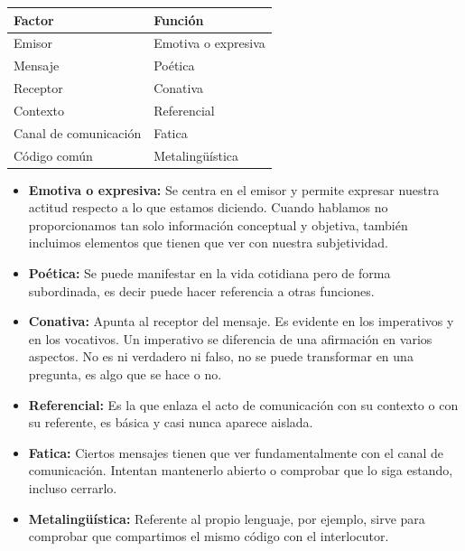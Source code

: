 \documentclass[a4paper,12pt,titlepage]{article} %
\begin{document}
\begin{center}
 \begin{tabular}{|l|l|}
   \hline
  \textbf{Factor}& \textbf{Función} \\
  \hline
  Emisor& Emotiva o expresiva\\
  \hline
  Mensaje& Poética\\
  \hline
  Receptor& Conativa\\
  \hline
  Contexto& Referencial\\
  \hline
  Canal de comunicación& Fatica\\
  \hline
  Código común& Metalingüística\\
  \hline
\end{tabular} 
\end{center}

\vspace{1cm}

\begin{itemize}
  \item \textbf{Emotiva o expresiva:}
    Se centra en el emisor y permite expresar nuestra actitud respecto a lo que estamos diciendo.
    Cuando hablamos no proporcionamos tan solo información conceptual y objetiva, también incluimos 
    elementos que tienen que ver con nuestra subjetividad.
  \item \textbf{Poética:}
    Se puede manifestar en la vida cotidiana pero de forma subordinada, es decir puede hacer 
    referencia a otras funciones.
  \item \textbf{Conativa:}
    Apunta al receptor del mensaje. Es evidente en los imperativos y en los vocativos.
    Un imperativo se diferencia de una afirmación en varios aspectos. 
    No es ni verdadero ni falso, no se puede transformar en una pregunta, es algo que se hace o no. 
  \item \textbf{Referencial:}
    Es la que enlaza el acto de comunicación con su contexto o con su referente, es básica y casi nunca aparece aislada.
  \item \textbf{Fatica:}
    Ciertos mensajes tienen que ver fundamentalmente con el canal de comunicación. Intentan mantenerlo
    abierto o comprobar que lo siga estando, incluso cerrarlo. 
  \item \textbf{Metalingüística:}
    Referente al propio lenguaje, por ejemplo, sirve para comprobar que compartimos el mismo código con el interlocutor.
\end{itemize}

\vspace{0.3cm}
\end{document}

